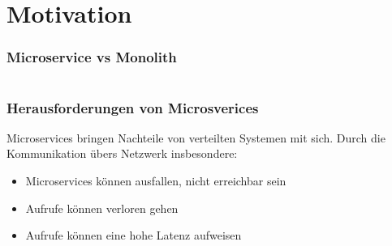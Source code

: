 \section{Motivation}

\begin{frame}
    \frametitle{Microservice vs Monolith}

    \begin{columns}
        
        \begin{column}{0.5\textwidth}
        \end{column}

        \begin{column}{0.5\textwidth}
            
            
        \end{column}


    \end{columns}

    
\end{frame}

\begin{frame}
    \frametitle{Herausforderungen von Microsverices}

    Microservices bringen Nachteile von verteilten Systemen mit sich. Durch die Kommunikation übers Netzwerk insbesondere:

    \begin{itemize}
        
        \item Microservices können ausfallen, nicht erreichbar sein
        \item Aufrufe können verloren gehen
        \item Aufrufe können eine hohe Latenz aufweisen
    \end{itemize}
\end{frame}


